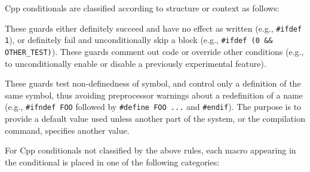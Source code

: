\documentclass[10pt]{article}
\begin{document}
Cpp conditionals are classified according to structure or context as follows:
\begin{description}\itemsep 0pt \parskip 0pt
\item[Commenting] These guards either definitely succeed and
  have no effect as written (e.g., \texttt{\#ifdef 1}), or definitely fail
  and unconditionally skip a block (e.g., {\tt \#ifdef (0 \&\&
  \verb|OTHER_TEST|)}).  These guards comment out code or override other
  conditions (e.g., to unconditionally enable or disable a previously experimental
  feature).
      
\item[Redefinition suppression] These guards test non-definedness of
  symbol, and control only a definition of the same symbol, thus avoiding
  preprocessor warnings about a redefinition of a name (e.g.,
  \texttt{\#ifndef FOO} followed by \texttt{\#define FOO ...} and
  \texttt{\#endif}).  
  The purpose is to provide a default value used unless another part of the
  system, or the compilation command, specifies another value.

\end{description}

For Cpp conditionals not classified by the above rules, each macro
appearing in the conditional is placed in one of the following categories:
\end{document}
